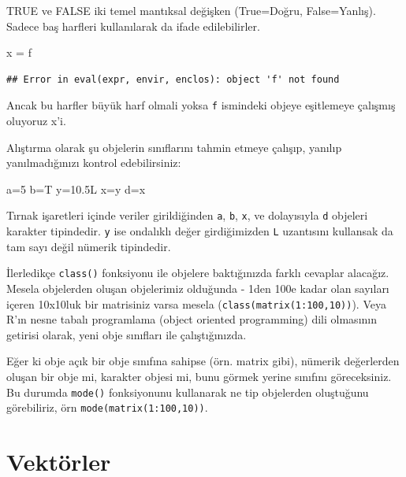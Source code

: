 \documentclass[
]{book}
\newenvironment{Shaded}{\begin{snugshade}}{\end{snugshade}}
\newcommand{\FloatTok}[1]{\textcolor[rgb]{0.00,0.00,0.81}{#1}}
\newcommand{\NormalTok}[1]{#1}
\newcommand{\StringTok}[1]{\textcolor[rgb]{0.31,0.60,0.02}{#1}}
\begin{document}
TRUE ve FALSE iki temel mantıksal değişken (True=Doğru, False=Yanlış). Sadece baş harfleri kullanılarak da ifade edilebilirler.

\begin{Shaded}
\begin{Highlighting}[]
\NormalTok{x =}\StringTok{ }\NormalTok{f}
\end{Highlighting}
\end{Shaded}

\begin{verbatim}
## Error in eval(expr, envir, enclos): object 'f' not found
\end{verbatim}

Ancak bu harfler büyük harf olmali yoksa \texttt{f} ismindeki objeye eşitlemeye çalışmış oluyoruz x'i.

Alıştırma olarak şu objelerin sınıflarını tahmin etmeye çalışıp, yanılıp yanılmadığınızı kontrol edebilirsiniz:

\begin{Shaded}
\begin{Highlighting}[]
\NormalTok{a=}\StringTok{\textquotesingle{}5\textquotesingle{}} 
\NormalTok{b=}\StringTok{\textquotesingle{}T\textquotesingle{}}
\NormalTok{y=}\FloatTok{10.5}\NormalTok{L}
\NormalTok{x=}\StringTok{\textquotesingle{}y\textquotesingle{}}
\NormalTok{d=x}
\end{Highlighting}
\end{Shaded}

Tırnak işaretleri içinde veriler girildiğinden \texttt{a}, \texttt{b}, \texttt{x}, ve dolayısıyla \texttt{d} objeleri karakter tipindedir. \texttt{y} ise ondalıklı değer girdiğimizden \texttt{L} uzantısını kullansak da tam sayı değil nümerik tipindedir.

İlerledikçe \texttt{class()} fonksiyonu ile objelere baktığınızda farklı cevaplar alacağız. Mesela objelerden oluşan objelerimiz olduğunda - 1den 100e kadar olan sayıları içeren 10x10luk bir matrisiniz varsa mesela (\texttt{class(matrix(1:100,10))}). Veya R'ın nesne tabalı programlama (object oriented programming) dili olmasının getirisi olarak, yeni obje sınıfları ile çalıştığınızda.

Eğer ki obje açık bir obje sınıfına sahipse (örn. matrix gibi), nümerik değerlerden oluşan bir obje mi, karakter objesi mi, bunu görmek yerine sınıfını göreceksiniz. Bu durumda \texttt{mode()} fonksiyonunu kullanarak ne tip objelerden oluştuğunu görebiliriz, örn \texttt{mode(matrix(1:100,10))}.

\hypertarget{vektuxf6rler}{%
\chapter{Vektörler}\label{vektuxf6rler}}
\end{document}
